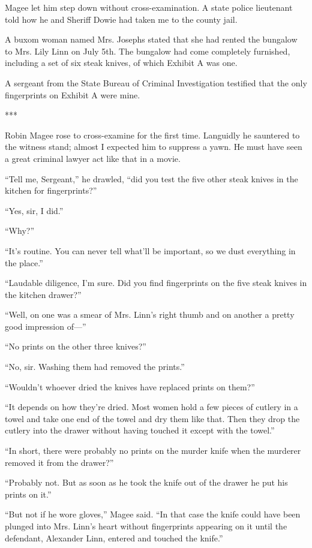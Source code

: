 \documentclass{novel}
\begin{document}
{Magee let him step down without cross-examination. A state police lieutenant told how he and Sheriff Dowie had taken me to the county jail.

A buxom woman named Mrs. Josephs stated that she had rented the bungalow to Mrs. Lily Linn on July 5th. The bungalow had come completely furnished, including a set of six steak knives, of which Exhibit A was one.

A sergeant from the State Bureau of Criminal Investigation testified that the only fingerprints on Exhibit A were mine.

***

Robin Magee rose to cross-examine for the first time. Languidly he sauntered to the witness stand; almost I expected him to suppress a yawn. He must have seen a great criminal lawyer act like that in a movie.

“Tell me, Sergeant,” he drawled, “did you test the five other steak knives in the kitchen for fingerprints?”

“Yes, sir, I did.”

“Why?”

“It’s routine. You can never tell what’ll be important, so we dust everything in the place.”

“Laudable diligence, I’m sure. Did you find fingerprints on the five steak knives in the kitchen drawer?”

“Well, on one was a smear of Mrs. Linn’s right thumb and on another a pretty good impression of—”

“No prints on the other three knives?”

“No, sir. Washing them had removed the prints.”

“Wouldn’t whoever dried the knives have replaced prints on them?”

“It depends on how they’re dried. Most women hold a few pieces of cutlery in a towel and take one end of the towel and dry them like that. Then they drop the cutlery into the drawer without having touched it except with the towel.”

“In short, there were probably no prints on the murder knife when the murderer removed it from the drawer?”

“Probably not. But as soon as he took the knife out of the drawer he put his prints on it.”

“But not if he wore gloves,” Magee said. “In that case the knife could have been plunged into Mrs. Linn’s heart without fingerprints appearing on it until the defendant, Alexander Linn, entered and touched the knife.”

}
\end{document}
